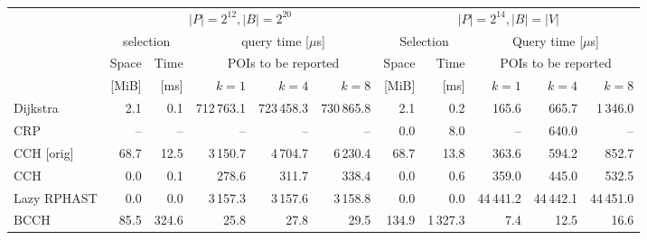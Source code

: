 \begin{tabular}{lrrrrrrrrrr}
\toprule
& \multicolumn{5}{c}{$|P| = 2^{12}, |B| = 2^{20}$} & \multicolumn{5}{c}{$|P| = 2^{14}, |B| = |V|$} \\ \cmidrule(lr){2-6}\cmidrule(l){7-11}
& \multicolumn{2}{c}{selection} & \multicolumn{3}{c}{query time [$\mu$s]} & \multicolumn{2}{c}{Selection} & \multicolumn{3}{c}{Query time [$\mu$s]} \\ \cmidrule(lr){2-3}\cmidrule(lr){4-6}\cmidrule(lr){7-8}\cmidrule(l){9-11}
& Space & Time & \multicolumn{3}{c}{POIs to be reported} & Space & Time & \multicolumn{3}{c}{POIs to be reported} \\
& [MiB] & [ms] & {$k = 1$} & {$k = 4$} & {$k = 8$} & [MiB] & {[ms]} & {$k = 1$} & {$k = 4$} & {$k = 8$} \\
\midrule
Dijkstra    &   2.1 &             0.1 & 712\,763.1 & 723\,458.3 & 730\,865.8 &   2.1 &             0.2 &   165.6 &   665.7 &  1\,346.0 \\
CRP         &    -- &              -- &       -- &       -- &       -- &   0.0 &             8.0 &      -- &   640.0 &      -- \\
CCH [orig]  &  68.7 &            12.5 &   3\,150.7 &   4\,704.7 &   6\,230.4 &  68.7 &            13.8 &   363.6 &   594.2 &   852.7 \\
CCH         &   0.0 &             0.1 &    278.6 &    311.7 &    338.4 &   0.0 &             0.6 &   359.0 &   445.0 &   532.5 \\
Lazy RPHAST &   0.0 &             0.0 &   3\,157.3 &   3\,157.6 &   3\,158.8 &   0.0 &             0.0 & 44\,441.2 & 44\,442.1 & 44\,451.0 \\
BCCH        &  85.5 &           324.6 &     25.8 &     27.8 &     29.5 & 134.9 &          1\,327.3 &     7.4 &    12.5 &    16.6 \\
\bottomrule
\end{tabular}

